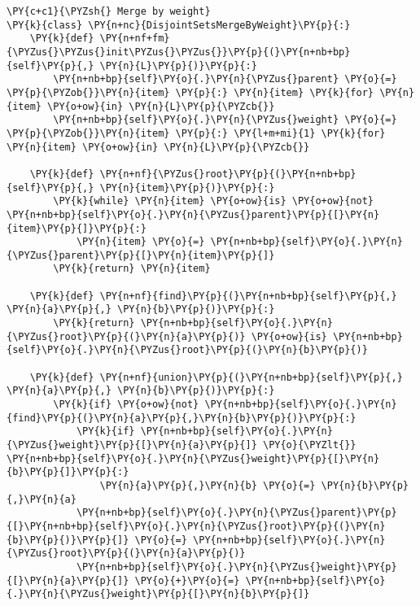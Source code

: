 \begin{Verbatim}[commandchars=\\\{\}]
\PY{c+c1}{\PYZsh{} Merge by weight}
\PY{k}{class} \PY{n+nc}{DisjointSetsMergeByWeight}\PY{p}{:}
    \PY{k}{def} \PY{n+nf+fm}{\PYZus{}\PYZus{}init\PYZus{}\PYZus{}}\PY{p}{(}\PY{n+nb+bp}{self}\PY{p}{,} \PY{n}{L}\PY{p}{)}\PY{p}{:}
        \PY{n+nb+bp}{self}\PY{o}{.}\PY{n}{\PYZus{}parent} \PY{o}{=} \PY{p}{\PYZob{}}\PY{n}{item} \PY{p}{:} \PY{n}{item} \PY{k}{for} \PY{n}{item} \PY{o+ow}{in} \PY{n}{L}\PY{p}{\PYZcb{}}
        \PY{n+nb+bp}{self}\PY{o}{.}\PY{n}{\PYZus{}weight} \PY{o}{=} \PY{p}{\PYZob{}}\PY{n}{item} \PY{p}{:} \PY{l+m+mi}{1} \PY{k}{for} \PY{n}{item} \PY{o+ow}{in} \PY{n}{L}\PY{p}{\PYZcb{}}

    \PY{k}{def} \PY{n+nf}{\PYZus{}root}\PY{p}{(}\PY{n+nb+bp}{self}\PY{p}{,} \PY{n}{item}\PY{p}{)}\PY{p}{:}
        \PY{k}{while} \PY{n}{item} \PY{o+ow}{is} \PY{o+ow}{not} \PY{n+nb+bp}{self}\PY{o}{.}\PY{n}{\PYZus{}parent}\PY{p}{[}\PY{n}{item}\PY{p}{]}\PY{p}{:}
            \PY{n}{item} \PY{o}{=} \PY{n+nb+bp}{self}\PY{o}{.}\PY{n}{\PYZus{}parent}\PY{p}{[}\PY{n}{item}\PY{p}{]}
        \PY{k}{return} \PY{n}{item}

    \PY{k}{def} \PY{n+nf}{find}\PY{p}{(}\PY{n+nb+bp}{self}\PY{p}{,} \PY{n}{a}\PY{p}{,} \PY{n}{b}\PY{p}{)}\PY{p}{:}
        \PY{k}{return} \PY{n+nb+bp}{self}\PY{o}{.}\PY{n}{\PYZus{}root}\PY{p}{(}\PY{n}{a}\PY{p}{)} \PY{o+ow}{is} \PY{n+nb+bp}{self}\PY{o}{.}\PY{n}{\PYZus{}root}\PY{p}{(}\PY{n}{b}\PY{p}{)}

    \PY{k}{def} \PY{n+nf}{union}\PY{p}{(}\PY{n+nb+bp}{self}\PY{p}{,} \PY{n}{a}\PY{p}{,} \PY{n}{b}\PY{p}{)}\PY{p}{:}
        \PY{k}{if} \PY{o+ow}{not} \PY{n+nb+bp}{self}\PY{o}{.}\PY{n}{find}\PY{p}{(}\PY{n}{a}\PY{p}{,}\PY{n}{b}\PY{p}{)}\PY{p}{:}
            \PY{k}{if} \PY{n+nb+bp}{self}\PY{o}{.}\PY{n}{\PYZus{}weight}\PY{p}{[}\PY{n}{a}\PY{p}{]} \PY{o}{\PYZlt{}} \PY{n+nb+bp}{self}\PY{o}{.}\PY{n}{\PYZus{}weight}\PY{p}{[}\PY{n}{b}\PY{p}{]}\PY{p}{:}
                \PY{n}{a}\PY{p}{,}\PY{n}{b} \PY{o}{=} \PY{n}{b}\PY{p}{,}\PY{n}{a}
            \PY{n+nb+bp}{self}\PY{o}{.}\PY{n}{\PYZus{}parent}\PY{p}{[}\PY{n+nb+bp}{self}\PY{o}{.}\PY{n}{\PYZus{}root}\PY{p}{(}\PY{n}{b}\PY{p}{)}\PY{p}{]} \PY{o}{=} \PY{n+nb+bp}{self}\PY{o}{.}\PY{n}{\PYZus{}root}\PY{p}{(}\PY{n}{a}\PY{p}{)}
            \PY{n+nb+bp}{self}\PY{o}{.}\PY{n}{\PYZus{}weight}\PY{p}{[}\PY{n}{a}\PY{p}{]} \PY{o}{+}\PY{o}{=} \PY{n+nb+bp}{self}\PY{o}{.}\PY{n}{\PYZus{}weight}\PY{p}{[}\PY{n}{b}\PY{p}{]}
\end{Verbatim}


